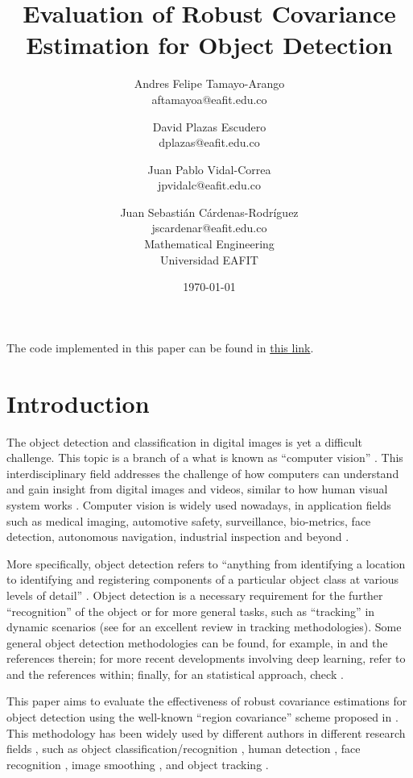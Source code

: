 \documentclass[11pt]{article}
\title{Evaluation of Robust Covariance Estimation for Object Detection}
\author{Andres Felipe Tamayo-Arango \\
  aftamayoa@eafit.edu.co \and
  David Plazas Escudero \\
  dplazas@eafit.edu.co \and
  Juan Pablo Vidal-Correa \\
  jpvidalc@eafit.edu.co \and
  Juan Sebasti\'an C\'ardenas-Rodríguez \\
  jscardenar@eafit.edu.co \\[0.5cm]
  Mathematical Engineering \\
  Universidad EAFIT}
\date{\today}
\theoremstyle{definition}
\theoremstyle{remark}
\theoremstyle{remark}
\theoremstyle{remark}
\begin{document}
\maketitle

The code implemented in this paper can be found in
\href{https://bit.ly/3rQbVRQ}{this link}.

\section{Introduction}\label{sec_int}
The object detection and classification in digital images is yet a difficult
challenge. This topic is a branch of a what is known as ``computer vision''
\parencite{amit20022d}. This interdisciplinary field addresses the challenge of
how computers can understand and gain insight from digital images and videos,
similar to how human visual system works
\parencite{ballard1982computer,huang1996computer,amit20022d,szeliski2010computer}.
Computer vision is widely used nowadays, in application fields such as medical
imaging, automotive safety, surveillance, bio-metrics, face detection,
autonomous navigation, industrial inspection and beyond
\parencite{huang1996computer,szeliski2010computer}.

More specifically, object detection refers to ``anything from identifying a
location to identifying and registering components of a particular object class
at various levels of detail'' \parencite{amit20022d}. Object detection is a
necessary requirement for the further ``recognition'' of the object or for more
general tasks, such as ``tracking'' in dynamic scenarios (see
\parencite{li2013survey} for an excellent review in tracking methodologies).
Some general object detection methodologies can be found, for example, in
\parencite{amit20022d,szeliski2010computer} and the references therein; for more
recent developments involving deep learning, refer to
\parencite{jiang2018deep,zhao2019object} and the references within; finally, for
an statistical approach, check \cite{li2015feature}.

This paper aims to evaluate the effectiveness of robust covariance estimations
for object detection using the well-known ``region covariance'' scheme proposed
in \parencite{tuzel2006}. This methodology has been widely used by different
authors in different research fields \cite{wu2012real}, such as object
classification/recognition
\parencite{hong2009sigma,sivalingam2010tensor,tosato2010multi}, human detection
\parencite{paisitkriangkrai2008fast,tuzel2007human,yao2007fast,hirzer2011person},
face recognition \cite{pang2008gabor,hariri20163d}, image smoothing
\parencite{karacan2013structure}, and object tracking
\parencite{porikli2006covariance,wu2008probabilistic,wu2009real,wu2009robust}.
\end{document}
